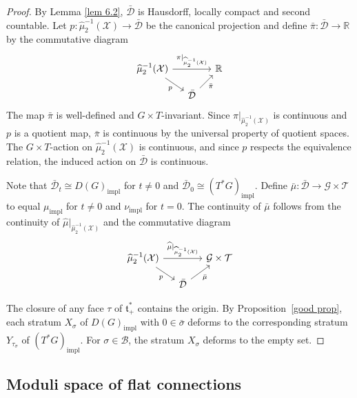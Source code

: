 \documentclass[reqno]{amsart}
\theoremstyle{plain}
\theoremstyle{definition}
\begin{document}
\begin{proof}
By Lemma \ref{lem 6.2}, $\bar{\mathcal{D}}$ is Hausdorff, locally compact and second countable.  Let $p: \widehat{\mu}_2^{-1}(\mathcal{X}) \to \bar{\mathcal{D}}$ be the canonical projection and define $\bar{\pi}: \bar{\mathcal{D}} \to \mathbb{R}$ by the commutative diagram
\[
\begin{tikzcd}[sep=small]
\widehat{\mu}_2^{-1}(\mathcal{X}) \arrow[rr, "{\pi|_{\widehat{\mu}_2^{-1}(\mathcal{X})}}"] \arrow[dr, "p"'] & & \mathbb{R} \\
& \bar{\mathcal{D}} \arrow[ur, "{\bar{\pi}}"']
\end{tikzcd}
\]
The map $\bar{\pi}$ is well-defined and $G\times T$-invariant. Since $\pi|_{\widehat{\mu}_2^{-1}(\mathcal{X})}$ is continuous and $p$ is a quotient map, $\bar{\pi}$ is continuous by the universal property of quotient spaces. The $G\times T$-action on $\widehat{\mu}_2^{-1}(\mathcal{X})$ is continuous, and since $p$ respects the equivalence relation, the induced action on $\bar{\mathcal{D}}$ is continuous.

Note that $\bar{\mathcal{D}}_t \cong D(G)_{\mathrm{impl}}$ for $t \neq 0$ and $\bar{\mathcal{D}}_0 \cong (T^*G)_{\mathrm{impl}}$. Define $\bar{\mu}: \bar{\mathcal{D}} \to \mathcal{G} \times \mathcal{T}$ to equal $\mu_{\mathrm{impl}}$ for $t \neq 0$ and $\nu_{\mathrm{impl}}$ for $t = 0$. The continuity of $\bar{\mu}$ follows from the continuity of $\widehat{\mu}|_{\widehat{\mu}_2^{-1}(\mathcal{X})}$ and the commutative diagram
\[
\begin{tikzcd}[sep=small]
\widehat{\mu}_2^{-1}(\mathcal{X}) \arrow[rr, "{\widehat{\mu}|_{\widehat{\mu}_2^{-1}(\mathcal{X})}}"] \arrow[dr, "p"'] & & \mathcal{G} \times \mathcal{T} \\
& \bar{\mathcal{D}} \arrow[ur, "{\bar{\mu}}"']
\end{tikzcd}
\]

The closure of any face $\tau$ of $\mathfrak{t}^*_+$ contains the origin. By Proposition~\ref{good prop}, each stratum $X_\sigma$ of $D(G)_{\mathrm{impl}}$ with $0 \in \bar{\sigma}$ deforms to the corresponding stratum $Y_{\tau_\sigma}$ of $(T^*G)_{\mathrm{impl}}$. For $\sigma \in \mathcal{B}$, the stratum $X_\sigma$ deforms to the empty set.
\end{proof}

\subsection{Moduli space of flat connections}
\end{document}
